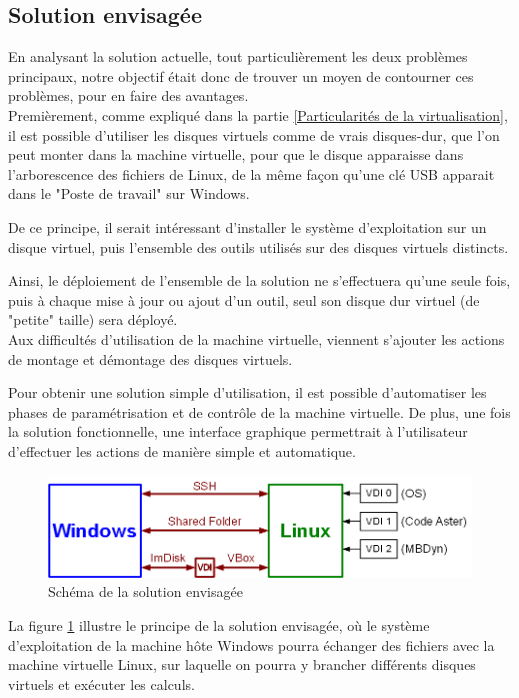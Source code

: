
\subsection{Solution envisagée}
\label{Solution envisagée}

En analysant la solution actuelle, tout particulièrement les deux problèmes principaux, notre objectif était donc de trouver un moyen de contourner ces problèmes, pour en faire des avantages.
\\


Premièrement, comme expliqué dans la partie \ref{Particularités de la virtualisation}, il est possible d'utiliser les disques virtuels comme de vrais disques-dur, que l'on peut monter dans la machine virtuelle, pour que le disque apparaisse dans l'arborescence des fichiers de Linux, de la même façon qu'une clé USB apparait dans le "Poste de travail" sur Windows.

De ce principe, il serait intéressant d'installer le système d'exploitation sur un disque virtuel, puis l'ensemble des outils utilisés sur des disques virtuels distincts.

Ainsi, le déploiement de l'ensemble de la solution ne s'effectuera qu'une seule fois, puis à chaque mise à jour ou ajout d'un outil, seul son disque dur virtuel (de "petite" taille) sera déployé.
\\


Aux difficultés d'utilisation de la machine virtuelle, viennent s'ajouter les actions de montage et démontage des disques virtuels.

Pour obtenir une solution simple d'utilisation, il est possible d'automatiser les phases de paramétrisation et de contrôle de la machine virtuelle.
De plus, une fois la solution fonctionnelle, une interface graphique permettrait à l'utilisateur d'effectuer les actions de manière simple et automatique.
\\


\begin{figure}[!h]
	\center
	\includegraphics[scale=0.5]{img/Solution_envisagee.png}
	\caption{Schéma de la solution envisagée}
	\label{Schéma Solution envisagée}
\end{figure}

La figure \ref{Schéma Solution envisagée} illustre le principe de la solution envisagée, où le système d'exploitation de la machine hôte Windows pourra échanger des fichiers avec la machine virtuelle Linux, sur laquelle on pourra y brancher différents disques virtuels et exécuter les calculs.